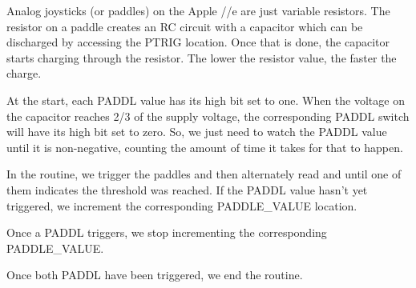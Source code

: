 \documentclass[10pt]{report}%
\begin{document}
Analog joysticks (or paddles) on the Apple //e are just variable resistors. The resistor on a paddle
creates an RC circuit with a capacitor which can be discharged by accessing the {\Tt{}PTRIG\nwendquote} location. Once
that is done, the capacitor starts charging through the resistor. The lower the resistor value, the
faster the charge.

At the start, each {\Tt{}PADDL\nwendquote} value has its high bit set to one.
When the voltage on the capacitor reaches {\Tt{}2/3\nwendquote} of the supply voltage, the
corresponding {\Tt{}PADDL\nwendquote} switch will have its high bit set to zero. So, we just need to watch the {\Tt{}PADDL\nwendquote}
value until it is non-negative, counting the amount of time it takes for that to happen.

In the {\Tt{}\nwendquote} routine, we trigger the paddles and then alternately read {\Tt{}\nwendquote} and {\Tt{}\nwendquote}
until one of them indicates the threshold was reached. If the {\Tt{}PADDL\nwendquote} value hasn't yet triggered,
we increment the corresponding {\Tt{}PADDLE{\_}VALUE\nwendquote} location.

Once a {\Tt{}PADDL\nwendquote} triggers, we stop incrementing the corresponding {\Tt{}PADDLE{\_}VALUE\nwendquote}.

Once both {\Tt{}PADDL\nwendquote} have been triggered, we end the routine.
\end{document}
